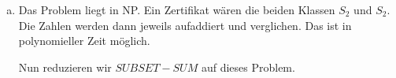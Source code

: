 \documentclass[12pt,a4paper]{article}
\begin{document}
\begin{enumerate}[a)]
	\item Das Problem liegt in NP. Ein Zertifikat wären die beiden Klassen $S_2$ und $S_2$. Die Zahlen werden dann jeweils aufaddiert und verglichen. Das ist in polynomieller Zeit möglich.
		
	Nun reduzieren wir $SUBSET-SUM$ auf dieses Problem.
	

\end{enumerate}
\end{document}
